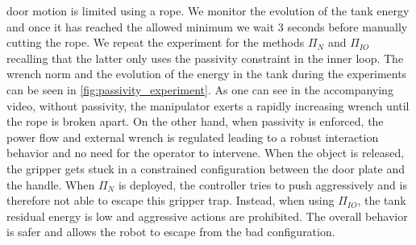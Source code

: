  door motion is limited using a rope.  We monitor the evolution of the tank energy and once it has reached the allowed minimum we wait 3 seconds before manually cutting the rope. We repeat the experiment for the methods $\Pi_{N}$ and $\Pi_{IO}$ recalling that the latter only uses the passivity constraint in the inner loop.
%
The wrench norm and the evolution of the energy in the tank during the experiments can be seen in \fig \ref{fig:passivity_experiment}. As one can see in the accompanying video, without passivity, the manipulator exerts a rapidly increasing wrench until the rope is broken apart. On the other hand, when passivity is enforced, the power flow and external wrench is regulated leading to a robust interaction behavior and no need for the operator to intervene. When the object is released, the gripper gets stuck in a constrained configuration between the door plate and the handle. When $\Pi_{N}$ is deployed, the controller tries to push aggressively and is therefore not able to escape this gripper trap. Instead, when using $\Pi_{IO}$, the tank residual energy is low and aggressive actions are prohibited. The overall behavior is safer and allows the robot to escape from the bad configuration.  

